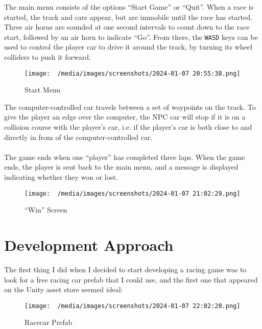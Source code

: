 \documentclass[a4paper,11pt]{article}
\begin{document}
The main menu consists of the options ``Start Game'' or ``Quit''.
When a race is started, the track and cars appear, but are immobile until the race has started.
Three air horns are sounded at one second intervals to count down to the race start, followed by an air horn to indicate ``Go''.
From there, the \verb|WASD| keys can be used to control the player car to drive it around the track, by turning its wheel colliders 
to push it forward.

\begin{figure}[H]
    \centering
    \texttt{[image: ~/media/images/screenshots/2024-01-07 20:55:38.png]}
    \caption{Start Menu}
\end{figure}

The computer-controlled car travels between a set of waypoints on the track. 
To give the player an edge over the computer, the NPC car will stop if it is on a collision course with the player's car, i.e. 
if the player's car is both close to and directly in from of the computer-controlled car.
\\\\
The game ends when one ``player'' has completed three laps.
When the game ends, the player is sent back to the main menu, and a message is displayed indicating whether they won or lost.

\begin{figure}[H]
    \centering
    \texttt{[image: ~/media/images/screenshots/2024-01-07 21:02:29.png]}
    \caption{``Win'' Screen}
\end{figure}

\section{Development Approach}
The first thing I did when I decided to start developing a racing game was to look for a free racing car prefab 
that I could use, and the first one that appeared on the Unity asset store seemed ideal:

\begin{figure}[H]
    \centering
    \texttt{[image: ~/media/images/screenshots/2024-01-07 22:02:20.png]}
    \caption{Racecar Prefab}
\end{figure}
\end{document}
